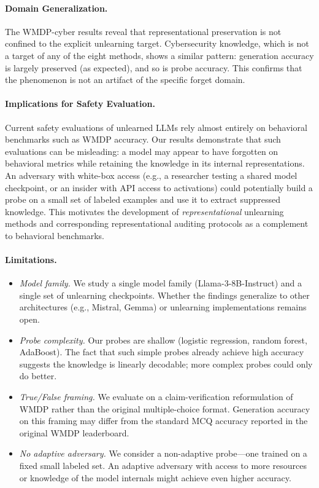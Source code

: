 \paragraph{Domain Generalization.}
The WMDP-cyber results reveal that representational preservation is not confined to
the explicit unlearning target.
Cybersecurity knowledge, which is not a target of any of the eight methods, shows a
similar pattern: generation accuracy is largely preserved (as expected), and so is
probe accuracy.
This confirms that the phenomenon is not an artifact of the specific forget domain.

\paragraph{Implications for Safety Evaluation.}
Current safety evaluations of unlearned LLMs rely almost entirely on behavioral
benchmarks such as WMDP accuracy.
Our results demonstrate that such evaluations can be misleading: a model may appear
to have forgotten on behavioral metrics while retaining the knowledge in its internal
representations.
An adversary with white-box access (e.g., a researcher testing a shared model
checkpoint, or an insider with API access to activations) could potentially build
a probe on a small set of labeled examples and use it to extract suppressed knowledge.
This motivates the development of \emph{representational} unlearning methods and
corresponding representational auditing protocols as a complement to behavioral
benchmarks.

\paragraph{Limitations.}
\begin{itemize}[leftmargin=1.5em, itemsep=2pt]
    \item \emph{Model family.} We study a single model family (Llama-3-8B-Instruct)
    and a single set of unlearning checkpoints.
    Whether the findings generalize to other architectures (e.g., Mistral, Gemma)
    or unlearning implementations remains open.

    \item \emph{Probe complexity.} Our probes are shallow (logistic regression,
    random forest, AdaBoost).
    The fact that such simple probes already achieve high accuracy suggests the
    knowledge is linearly decodable; more complex probes could only do better.

    \item \emph{True/False framing.} We evaluate on a claim-verification
    reformulation of WMDP rather than the original multiple-choice format.
    Generation accuracy on this framing may differ from the standard MCQ
    accuracy reported in the original WMDP leaderboard.

    \item \emph{No adaptive adversary.} We consider a non-adaptive probe---one
    trained on a fixed small labeled set.
    An adaptive adversary with access to more resources or knowledge of the model
    internals might achieve even higher accuracy.
\end{itemize}

